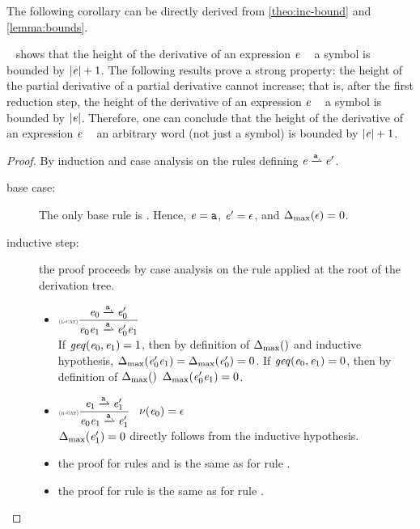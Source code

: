 The following corollary can be directly derived from \cref{theo:inc-bound} and \cref{lemma:bounds}.
~ shows that the height of the derivative of an expression $\mathit {e}$ \wrt~ a symbol is bounded by ${\mid}{\mathit {e}}{\mid}+1$.
The following results prove a strong property: the height of the partial derivative of a partial derivative cannot increase; that is, after the first reduction step, the height of the derivative of an expression $\mathit {e}$ \wrt~ a symbol is bounded by ${\mid}{\mathit {e}}{\mid}$.
Therefore, one can conclude that the height of the derivative of an expression $\mathit {e}$ \wrt~ an arbitrary  word (not just a symbol) is bounded by ${\mid}{\mathit {e}}{\mid}+1$.
\begin{proof}
 By induction and case analysis on the rules defining $\re\parDer{\sym}\re'$.
 \begin{description}
  \item[base case:] The only base rule is .
   Hence, $\mathit {e}=\mathtt {a}$, $\mathit {e}'=\mathtt {\epsilon}$, and
   ${\Delta_{\max}}({\mathtt {\epsilon}})=0$.
  \item[inductive step:] the proof proceeds by case analysis on the rule applied
   at the root of the derivation tree.
   \begin{itemize}
    \item $\Rule{l-cat}{\re_0\parDer{\sym}\re'_0}{\re_0\catop\re_1\parDer{\sym}\re'_0\catop\re_1}{}$\\[2ex]
          If $\mathit{geq}({\mathit {e}_0},{\mathit {e}_1})=1$, then by definition of ${\Delta_{\max}}({})$ and inductive hypothesis, ${\Delta_{\max}}({\mathit {e}'_0\mathit {e}_1})={\Delta_{\max}}({\mathit {e}'_0})=0$.
          If $\mathit{geq}({\mathit {e}_0},{\mathit {e}_1})=0$, then by definition of ${\Delta_{\max}}({})$ ${\Delta_{\max}}({\mathit {e}'_0\mathit {e}_1})=0$.

    \item $\Rule{r-cat}{\re_1\parDer{\sym}\re'_1}{\re_0\catop\re_1\parDer{\sym}\re'_1}{\hasEps{\re_0}=\eps}$\\[2ex]
          ${\Delta_{\max}}({\mathit {e}'_1})=0$ directly follows from the inductive hypothesis.

    \item the proof for rules  and  is the same as for rule .

    \item the proof for rule  is the same as for rule .
   \end{itemize}
 \end{description}
\end{proof}

